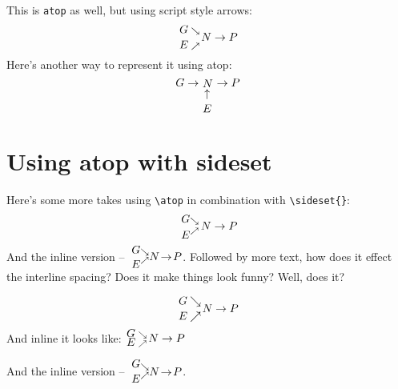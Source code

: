 \documentclass[11pt]{article}
\makeatletter
\newcommand{\superimpose}[2]{%
  {\ooalign{$#1\@firstoftwo#2$\cr\hfil$#1\@secondoftwo#2$\hfil\cr}}}
\newcommand{\GE}{\mathpalette\superimpose{{G}{E}}}
\newcommand{\GP}{\ensuremath{\ooalign{\raisebox{1ex}{$G$}\cr\hidewidth\raisebox{-1ex}{$E$}}}
{\ooalign{\raisebox{0.85ex}{${\scriptstyle\searrow}$}\cr\hidewidth\raisebox{-0.5ex}{${\mkern1mu\scriptstyle\nearrow}$}  }  }}
\newcommand{\GTP}{\ensuremath{\ooalign{\raisebox{1ex}{$G$}\cr\hidewidth\raisebox{-1ex}{$E$}}}\!\ensuremath{{{\scriptstyle\searrow}\atop{\scriptstyle\nearrow}}}}
\makeatother
\begin{document}
This is \verb|atop| as well, but using script style arrows:
\[
{G \atop E} {{\scriptstyle \searrow} \atop {\scriptstyle \nearrow}} N \to P
\]
Here's another way to represent it using atop:
\[
    G \rightarrow \mathop{N}_{\displaystyle {\uparrow \atop E}} \rightarrow P
\]

\section*{Using atop with sideset}
Here's some more takes using \verb|\atop| in combination with \verb|\sideset{}|:
\[
{\sideset{}{_{\searrow}}{\mathop{G}} \atop \sideset{}{^{\nearrow}}{\mathop{E}}}  N \to P
\]
And the inline version -- \(
{\sideset{}{_{\searrow}}{\mathop{G}} \atop \sideset{}{^{\nearrow}}{\mathop{E}}}\!N\!\to\!P
\). Followed by more text, how does it effect the interline spacing?  Does it make things look funny?  Well, does it?


\[
{{\textstyle G} \atop {\textstyle E}} {\searrow \atop \nearrow} N \to P
\]
And inline it looks like: \(
{{\textstyle G} \atop {\textstyle E}} {\searrow \atop \nearrow} N \to P
\)

And the inline version -- \(
{\sideset{}{_{\searrow}}{\mathop{\textstyle G}} \atop \sideset{}{^{\nearrow}}{\mathop{\textstyle E}}}\!N\!\to\!P
\).



% 
% 

% 

% 
% 
\end{document}
